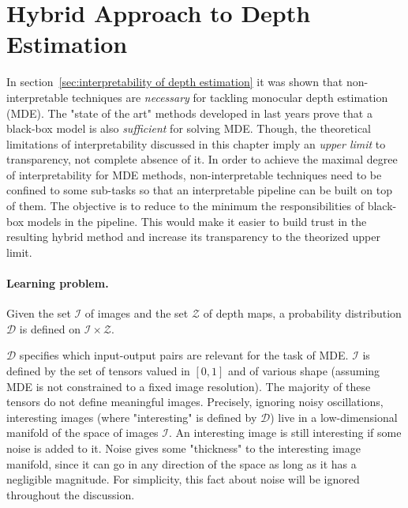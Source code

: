 \section{Hybrid Approach to Depth Estimation}
\label{sec:hybrid}
In section~\ref{sec:interpretability of depth estimation} it was shown that non-interpretable techniques are \textit{necessary} for tackling monocular depth estimation (MDE).
The "state of the art" methods developed in last years prove that a black-box model is also \textit{sufficient} for solving MDE.
Though, the theoretical limitations of interpretability discussed in this chapter imply an \textit{upper limit} to transparency, not complete absence of it.
In order to achieve the maximal degree of interpretability for MDE methods, non-interpretable techniques need to be confined to some sub-tasks so that an interpretable pipeline can be built on top of them.
The objective is to reduce to the minimum the responsibilities of black-box models in the pipeline.
This would make it easier to build trust in the resulting hybrid method and increase its transparency to the theorized upper limit.

\vspace{0.5cm}

\paragraph{Learning problem.}
Given the set $\mathcal{I}$ of images and the set $\mathcal{Z}$ of depth maps, a probability distribution $\mathcal{D}$ is defined on $\mathcal{I} \times \mathcal{Z}$.

$\mathcal{D}$ specifies which input-output pairs are relevant for the task of MDE.
$\mathcal{I}$ is defined by the set of tensors valued in $[0, 1]$ and of various shape (assuming MDE is not constrained to a fixed image resolution).
The majority of these tensors do not define meaningful images.
Precisely, ignoring noisy oscillations, interesting images (where "interesting" is defined by $\mathcal{D}$) live in a low-dimensional manifold of the space of images $\mathcal{I}$.
An interesting image is still interesting if some noise is added to it.
Noise gives some "thickness" to the interesting image manifold, since it can go in any direction of the space as long as it has a negligible magnitude.
For simplicity, this fact about noise will be ignored throughout the discussion.

